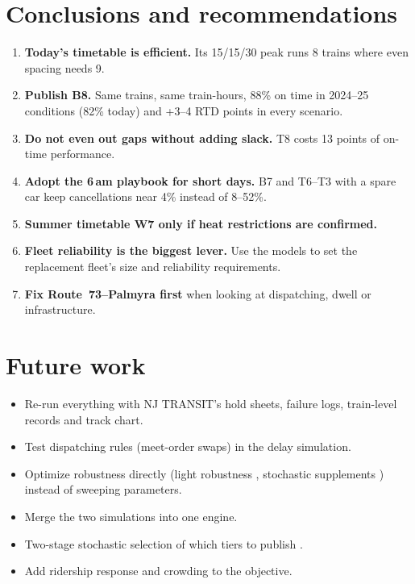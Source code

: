 \documentclass[11pt]{article}
\begin{document}
\section{Conclusions and recommendations}\label{sec:conclusions}
\begin{enumerate}
\item \textbf{Today's timetable is efficient.} Its 15/15/30 peak runs 8 trains where even spacing needs 9.
\item \textbf{Publish B8.} Same trains, same train-hours, 88\% on time in 2024--25 conditions (82\% today) and +3--4 RTD points in every scenario.
\item \textbf{Do not even out gaps without adding slack.} T8 costs 13 points of on-time performance.
\item \textbf{Adopt the 6\,am playbook for short days.} B7 and T6--T3 with a spare car keep cancellations near 4\% instead of 8--52\%.
\item \textbf{Summer timetable W7 only if heat restrictions are confirmed.}
\item \textbf{Fleet reliability is the biggest lever.} Use the models to set the replacement fleet's size and reliability requirements.
\item \textbf{Fix Route~73--Palmyra first} when looking at dispatching, dwell or infrastructure.
\end{enumerate}

\section{Future work}\label{sec:future}
\begin{itemize}
\item Re-run everything with NJ TRANSIT's hold sheets, failure logs, train-level records and track chart.
\item Test dispatching rules (meet-order swaps) in the delay simulation.
\item Optimize robustness directly (light robustness \citep{fischetti2009light}, stochastic supplements \citep{kroon2008stochastic}) instead of sweeping parameters.
\item Merge the two simulations into one engine.
\item Two-stage stochastic selection of which tiers to publish \citep{liebchen2009concept}.
\item Add ridership response and crowding to the objective.
\end{itemize}

\clearpage


\end{document}
